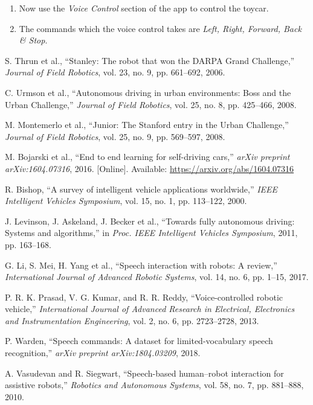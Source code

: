 \documentclass[conference]{IEEEtran}
\begin{document}
\begin{enumerate}
\item Now use the {\em Voice Control} section of the app to control the toycar.

\item The commands which the voice control takes are \textit{Left, Right, Forward, Back \& Stop}.

\end{enumerate}
\begin{thebibliography}{00}

S. Thrun et al., ``Stanley: The robot that won the DARPA Grand Challenge,'' \textit{Journal of Field Robotics}, vol. 23, no. 9, pp. 661–692, 2006.

C. Urmson et al., ``Autonomous driving in urban environments: Boss and the Urban Challenge,'' \textit{Journal of Field Robotics}, vol. 25, no. 8, pp. 425–466, 2008.

M. Montemerlo et al., ``Junior: The Stanford entry in the Urban Challenge,'' \textit{Journal of Field Robotics}, vol. 25, no. 9, pp. 569–597, 2008.

M. Bojarski et al., ``End to end learning for self-driving cars,'' \textit{arXiv preprint arXiv:1604.07316}, 2016. [Online]. Available: \url{https://arxiv.org/abs/1604.07316}

R. Bishop, ``A survey of intelligent vehicle applications worldwide,'' \textit{IEEE Intelligent Vehicles Symposium}, vol. 15, no. 1, pp. 113–122, 2000.

J. Levinson, J. Askeland, J. Becker et al., ``Towards fully autonomous driving: Systems and algorithms,'' in \textit{Proc. IEEE Intelligent Vehicles Symposium}, 2011, pp. 163–168.

G. Li, S. Mei, H. Yang et al., ``Speech interaction with robots: A review,'' \textit{International Journal of Advanced Robotic Systems}, vol. 14, no. 6, pp. 1–15, 2017.

P. R. K. Prasad, V. G. Kumar, and R. R. Reddy, ``Voice-controlled robotic vehicle,'' \textit{International Journal of Advanced Research in Electrical, Electronics and Instrumentation Engineering}, vol. 2, no. 6, pp. 2723–2728, 2013.

P. Warden, ``Speech commands: A dataset for limited-vocabulary speech recognition,'' \textit{arXiv preprint arXiv:1804.03209}, 2018.

A. Vasudevan and R. Siegwart, ``Speech-based human–robot interaction for assistive robots,'' \textit{Robotics and Autonomous Systems}, vol. 58, no. 7, pp. 881–888, 2010.

\end{thebibliography}
\end{document}
